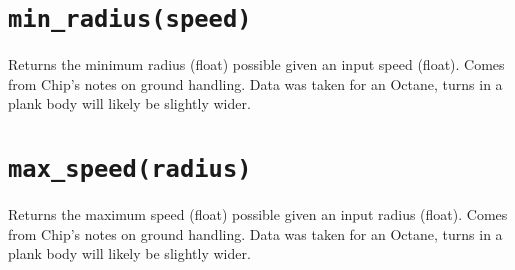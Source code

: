 \documentclass{article}
\newcommand{\function}[1]{\section{\texttt{#1}}}
\begin{document}
\begin{flushleft}
\function{min\_radius(speed)}
         {
           Returns the minimum radius (float) possible given an input speed (float).  Comes from Chip's notes on ground handling.  Data was taken for an Octane, turns in a plank body will likely be slightly wider.
         }



\function{max\_speed(radius)}
         {
           Returns the maximum speed (float) possible given an input radius (float).  Comes from Chip's notes on ground handling.  Data was taken for an Octane, turns in a plank body will likely be slightly wider.
         }




























  
  





\end{flushleft}
\end{document}
